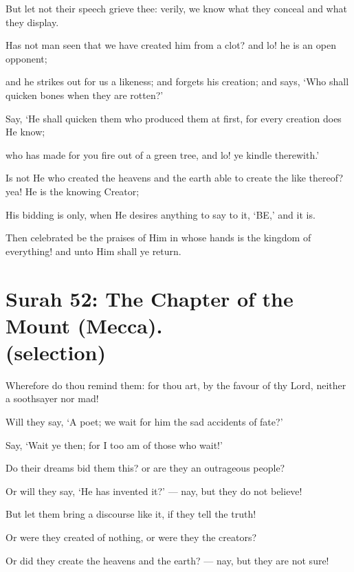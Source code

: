 \documentclass[fontsize=14pt, letterpaper, notitlepage, openany, DIV=12]{scrbook} %
\begin{document}
\noindent[36:76]
But let not their speech grieve thee: verily, we know what they conceal and what they
display.

\noindent[36:77]
Has not man seen that we have created him from a clot? and lo! he is an open opponent;

\noindent[36:78]
and he strikes out for us a likeness; and forgets his creation; and says, `Who shall quicken
bones when they are rotten?'

\noindent[36:79]
Say, `He shall quicken them who produced them at first, for every creation does He
know;

\noindent[36:80]
who has made for you fire out of a green tree, and lo! ye kindle therewith.'

\noindent[36:81]
Is not He who created the heavens and the earth able to create the like thereof? yea! He is
the knowing Creator;

\noindent[36:82]
His bidding is only, when He desires anything to say to it, `BE,' and it is.

\noindent[36:83]
Then celebrated be the praises of Him in whose hands is the kingdom of everything! and
unto Him shall ye return.


\section[Surah 52: The Chapter of the Mount (Mecca).]{Surah 52: The Chapter of the Mount (Mecca).\\ (selection)}


\noindent[52:29]
Wherefore do thou remind them: for thou art, by the favour of thy Lord, neither a
soothsayer nor mad!

\noindent[52:30]
Will they say, `A poet; we wait for him the sad accidents of fate?'

\noindent[52:31]
Say, `Wait ye then; for I too am of those who wait!'

\noindent[52:32]
Do their dreams bid them this? or are they an outrageous people?

\noindent[52:33]
Or will they say, `He has invented it?' --- nay, but they do not believe!

\noindent[52:34]
But let them bring a discourse like it, if they tell the truth!

\noindent[52:35]
Or were they created of nothing, or were they the creators?

\noindent[52:36]
Or did they create the heavens and the earth? --- nay, but they are not sure!
\end{document}
